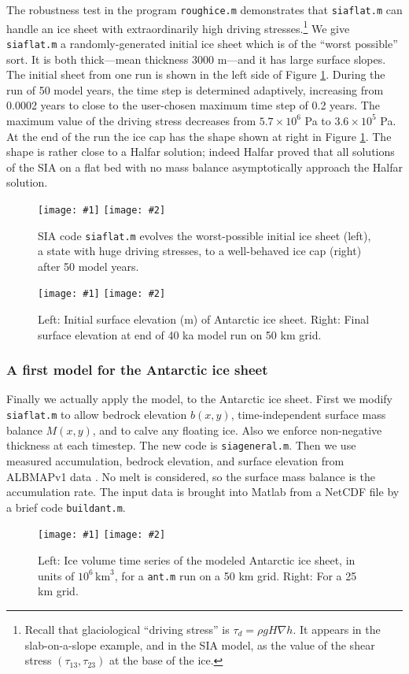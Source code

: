 \documentclass[titlepage,letterpaper,final,12pt]{scrartcl}
\newcommand{\grad}{\nabla}
\newcommand{\twofigsizes}[5]{
\begin{figure}[ht]
\centering
\texttt{[image: \#1]} \quad
\texttt{[image: \#2]}
\caption{#3}
\label{fig:#1}
\end{figure}}
\newcommand{\twofig}[3]{\twofigsizes{#1}{#2}{#3}{2.5in}{2.5in}}
\begin{document}
The robustness test in the program \texttt{roughice.m} demonstrates that \texttt{siaflat.m} can handle an ice sheet with extraordinarily high driving stresses.\footnote{Recall that glaciological ``driving stress'' is $\tau_d = \rho g H \grad h$.  It appears in the slab-on-a-slope example, and in the SIA model, as the value of the shear stress $(\tau_{13},\tau_{23})$ at the base of the ice.}  We give \texttt{siaflat.m} a randomly-generated initial ice sheet which is of the ``worst possible'' sort.  It is both thick---mean thickness 3000 m---and it has large surface slopes.  The initial sheet from one run is shown in the left side of Figure \ref{fig:roughinitial}.  During the run of 50 model years, the time step is determined adaptively, increasing from 0.0002 years to close to the user-chosen maximum time step of 0.2 years.  The maximum value of the driving stress decreases from $5.7\times 10^6$ Pa to $3.6\times 10^5$ Pa.  At the end of the run the ice cap has the shape shown at right in Figure \ref{fig:roughinitial}.  The shape is rather close to a Halfar solution; indeed Halfar proved that all solutions of the SIA on a flat bed with no mass balance asymptotically approach the Halfar solution.

\twofig{roughinitial}{roughfinal}{SIA code \texttt{siaflat.m} evolves the worst-possible initial ice sheet (left), a state with huge driving stresses, to a well-behaved ice cap (right) after 50 model years.}

\twofigsizes{antinitial}{antfinal}{Left: Initial surface elevation (m) of Antarctic ice sheet.  Right: Final surface elevation at end of 40 ka model run on 50 km grid.}{2.55in}{3.2in}

\subsubsection*{A first model for the Antarctic ice sheet}  Finally we actually apply the model, to the Antarctic ice sheet.  First we modify \texttt{siaflat.m} to allow bedrock elevation $b(x,y)$, time-independent surface mass balance $M(x,y)$, and to calve any floating ice.  Also we enforce non-negative thickness at each timestep.  The new code is \texttt{siageneral.m}.  Then we use measured accumulation, bedrock elevation, and surface elevation from ALBMAPv1 data \cite{LeBrocqetal2010}.  No melt is considered, so the surface mass balance is the accumulation rate.  The input data is brought into Matlab from a NetCDF file by a brief code \texttt{buildant.m}.

\twofig{antvol}{antvol25km}{Left: Ice volume time series of the modeled Antarctic ice sheet, in units of $10^6 \, \text{km}^3$, for a \texttt{ant.m} run on a 50 km grid.  Right:  For a 25 km grid.}
\end{document}
